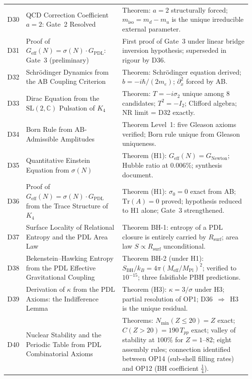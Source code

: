 \documentclass[11pt,a4paper]{article}
\theoremstyle{plain}
\theoremstyle{definition}
\theoremstyle{remark}
\newcommand{\Geff}{G_{\mathrm{eff}}}
\newcommand{\GPDL}{G_{\mathrm{PDL}}}
\newcommand{\Rsurf}{R_{\mathrm{surf}}}
\newcommand{\sigmaN}{\sigma(N)}
\newcommand{\SBH}{S_{\mathrm{BH}}}
\newcommand{\Meff}{M_{\mathrm{eff}}}
\newcommand{\MPl}{M_{\mathrm{Pl}}}
\newcommand{\Tpp}{T_{pp}}
\begin{document}
\begin{longtable}{L{1.3cm}L{3.8cm}L{8.0cm}}
D30 & QCD Correction Coefficient $a=2$: Gate~2 Resolved~\cite{D30} & \textcolor{proofblue}{Theorem}: $a=2$ structurally forced; $m_{\mathrm{iso}}=m_d-m_u$ is the unique irreducible external parameter.\\[0.3em]
D31 & Proof of $\Geff(N)=\sigmaN\cdot\GPDL$: Gate~3 (preliminary)~\cite{D31} & First proof of Gate~3 under linear bridge inversion hypothesis; superseded in rigour by D36.\\[0.3em]
D32 & Schr\"odinger Dynamics from the AB Coupling Criterion~\cite{D32} & \textcolor{proofblue}{Theorem}: Schr\"odinger equation derived; $b=-i\hbar/(2m_e)$; $\partial_x^2$ forced by AB.\\[0.3em]
D33 & Dirac Equation from the $\mathrm{SL}(2,\mathbb{C})$ Pulsation of $K_4$~\cite{D33} & \textcolor{proofblue}{Theorem}: $T=-i\sigma_2$ unique among 8 candidates; $T^2=-I_2$; Clifford algebra; NR limit = D32 exactly.\\[0.3em]
D34 & Born Rule from AB-Admissible Amplitudes~\cite{D34} & \textcolor{proofblue}{Theorem} Level~1: five Gleason axioms verified; Born rule unique from Gleason uniqueness.\\[0.3em]
D35 & Quantitative Einstein Equation from $\sigmaN$~\cite{D35} & \textcolor{proofblue}{Theorem (H1)}: $G_{\mathrm{eff}}(N)=G_{\mathrm{Newton}}$; Hubble ratio at $0.006\%$; synthesis document.\\[0.3em]
D36 & Proof of $\Geff(N)=\sigmaN\cdot\GPDL$ from the Trace Structure of $K_4$~\cite{D36} & \textcolor{proofblue}{Theorem (H1)}: $\sigma_0=0$ exact from AB; $\mathrm{Tr}(A)=0$ proved; hypothesis reduced to H1 alone; Gate~3 strengthened.\\[0.4em]
D37 & Surface Locality of Relational Entropy and the PDL Area Law~\cite{D37} & \textcolor{proofblue}{Theorem BH-1}: entropy of a PDL closure is entirely carried by $\Rsurf$; area law $S\propto\Rsurf$ unconditional.\\[0.3em]
D38 & Bekenstein--Hawking Entropy from the PDL Effective Gravitational Coupling~\cite{D38} & \textcolor{proofblue}{Theorem BH-2} (under H1): $\SBH/k_B=4\pi(\Meff/\MPl)^2$; verified to $10^{-15}$; three falsifiable PBH predictions.\\[0.3em]
D39 & Derivation of $\kappa$ from the PDL Axioms: the Indifference Lemma~\cite{D39} & \textcolor{proofblue}{Theorem (H3)}: $\kappa=3/\sigma$ under H3; partial resolution of OP1; D36~$\Rightarrow$~H3 is the unique residual.\\[0.4em]
D40 & Nuclear Stability and the Periodic Table from PDL Combinatorial Axioms~\cite{D40} & \textcolor{proofblue}{Theorems}: $N_{\min}(Z\leq20)=Z$ exact; $C(Z>20)=190\,\Tpp$ exact; valley of stability at $100\%$ for $Z=1$--82; eight assembly rules; connection identified between OP14 (sub-shell filling rates) and OP12 (BH coefficient $\tfrac{1}{4}$).\\[0.4em]

\end{longtable}
\end{document}
